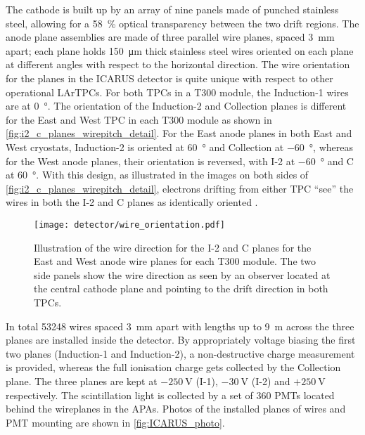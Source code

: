 The cathode is built up by an array of nine panels made of punched stainless steel, allowing for a \SI{58}{\percent} optical transparency between the two drift regions. The anode plane assemblies are made of three parallel wire planes, spaced \SI{3}{\mm} apart; each plane holds \SI{150}{\um} thick stainless steel wires oriented on each plane at different angles with respect to the horizontal direction. The wire orientation for the planes in the ICARUS detector is quite unique with respect to other operational LArTPCs. For both TPCs in a T300 module, the Induction-1 wires are at \SI{0}{\degree}. The orientation of the  Induction-2 and Collection planes is different for the East and West TPC in each T300 module as shown in \autoref{fig:i2_c_planes_wirepitch_detail}. For the East anode planes in both East and West cryostats, Induction-2 is oriented at \SI{+60}{\degree} and Collection at \SI{-60}{\degree}, whereas for the West anode planes, their orientation is reversed, with I-2 at \SI{-60}{\degree} and C at \SI{+60}{\degree}. With this design, as illustrated in the images on both sides of \autoref{fig:i2_c_planes_wirepitch_detail}, electrons drifting from either TPC ``see'' the wires in both the I-2 and C planes as identically oriented \cite{amerioDesignConstructionTests2004c}. 

\begin{figure}
    \centering
    \texttt{[image: detector/wire\_orientation.pdf]}
    \caption[T300 module Induction-2 and collection planes wire orientation]{Illustration of the wire direction for the I-2 and C planes for the East and West anode wire planes for each T300 module. The two side panels show the wire direction as seen by an observer located at the central cathode plane and pointing to the drift direction in both TPCs.}
    \label{fig:i2_c_planes_wirepitch_detail}
\end{figure}

In total \num{53248} wires spaced \SI{3}{\mm} apart with lengths up to \SI{9}{\m} across the three planes are installed inside the detector. By appropriately voltage biasing the first two planes (Induction-1 and Induction-2), a non-destructive charge measurement is provided, whereas the full ionisation charge gets collected by the Collection plane. The three planes are kept at $-\SI{250}{\volt}$ (I-1), $-\SI{30}{\volt}$ (I-2) and $+\SI{250}{\volt}$ respectively. The scintillation light is collected by a set of \num{360} PMTs located behind the wireplanes in the APAs. Photos of the installed planes of wires and PMT mounting are shown in \autoref{fig:ICARUS_photo}. 

